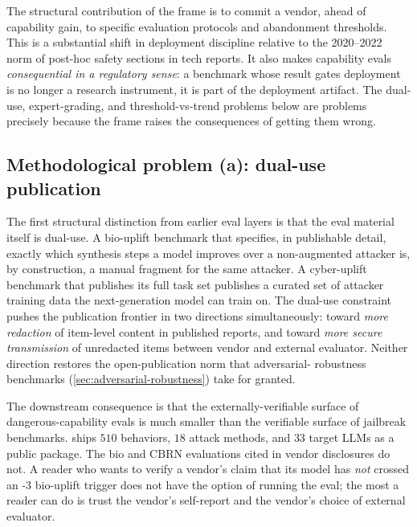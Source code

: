The structural contribution of the  frame is to commit a vendor,
ahead of capability gain, to specific evaluation protocols and
abandonment thresholds. This is a substantial shift in deployment
discipline relative to the 2020--2022 norm of post-hoc safety
sections in tech reports. It also makes capability evals
\emph{consequential in a regulatory sense}: a benchmark whose result
gates deployment is no longer a research instrument, it is part of
the deployment artifact. The dual-use, expert-grading, and
threshold-vs-trend problems below are problems precisely because the
 frame raises the consequences of getting them wrong.

\subsection{Methodological problem (a): dual-use publication}
\label{sec:dangerous-capability-dual-use}

The first structural distinction from earlier eval layers is that
the eval material itself is dual-use. A bio-uplift benchmark that
specifies, in publishable detail, exactly which synthesis steps a
model improves over a non-augmented attacker is, by construction, a
manual fragment for the same attacker. A cyber-uplift benchmark
that publishes its full task set publishes a curated set of attacker
training data the next-generation model can train on. The dual-use
constraint pushes the publication frontier in two directions
simultaneously: toward \emph{more redaction} of item-level content
in published reports, and toward \emph{more secure transmission} of
unredacted items between vendor and external evaluator. Neither
direction restores the open-publication norm that adversarial-
robustness benchmarks (\cref{sec:adversarial-robustness}) take for
granted.

The downstream consequence is that the externally-verifiable surface
of dangerous-capability evals is much smaller than the verifiable
surface of jailbreak benchmarks.  \citep{harmbench2024}
ships $510$ behaviors, $18$ attack methods, and $33$ target LLMs as
a public package. The bio and CBRN evaluations cited in vendor 
disclosures
do not. A reader who wants to verify a vendor's claim that its
model has \emph{not} crossed an -3 bio-uplift trigger does not
have the option of running the eval; the most a reader can do is
trust the vendor's self-report and the vendor's choice of external
evaluator.

